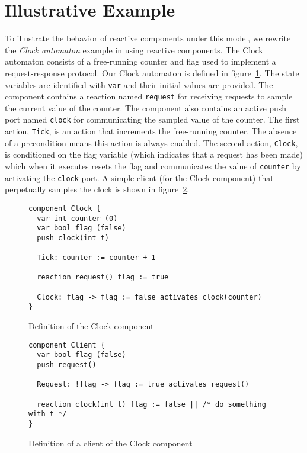 \section{Illustrative Example}
To illustrate the behavior of reactive components under this model, we rewrite the \emph{Clock automaton} example in \cite{nancy1996distributed} using reactive components.
The Clock automaton consists of a free-running counter and flag used to implement a request-response protocol.
Our Clock automaton is defined in figure~\ref{clock_component}.
The state variables are identified with \verb+var+ and their initial values are provided.
The component contains a reaction named \verb+request+ for receiving requests to sample the current value of the counter.
The component also contains an active push port named \verb+clock+ for communicating the sampled value of the counter.
The first action, \verb+Tick+, is an action that increments the free-running counter.
The absence of a precondition means this action is always enabled.
The second action, \verb+Clock+, is conditioned on the flag variable (which indicates that a request has been made) which when it executes resets the flag and communicates the value of \verb+counter+ by activating the \verb+clock+ port.
A simple client (for the Clock component) that perpetually samples the clock is shown in figure~\ref{client_component}.

\begin{figure}
\begin{verbatim}
component Clock {
  var int counter (0)
  var bool flag (false)
  push clock(int t)

  Tick: counter := counter + 1

  reaction request() flag := true

  Clock: flag -> flag := false activates clock(counter)
}
\end{verbatim}
\caption{Definition of the Clock component\label{clock_component}}
\end{figure}

\begin{figure}
\begin{verbatim}
component Client {
  var bool flag (false)
  push request()

  Request: !flag -> flag := true activates request()

  reaction clock(int t) flag := false || /* do something with t */
}
\end{verbatim}
\caption{Definition of a client of the Clock component\label{client_component}}
\end{figure}

